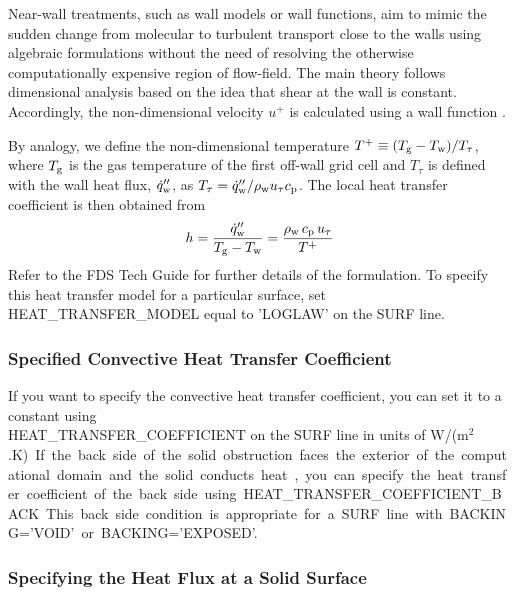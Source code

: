 \documentclass[11pt]{book}
\begin{document}
Near-wall treatments, such as wall models or wall functions, aim to mimic the sudden change from molecular to turbulent transport close to the walls using algebraic formulations without the need of resolving the otherwise computationally expensive region of flow-field. The main theory follows dimensional analysis based on the idea that shear at the wall is constant. Accordingly, the non-dimensional velocity $u^+$ is calculated using a wall function \cite{FDS_Tech_Guide}.

By analogy, we define the non-dimensional temperature $T^+ \equiv (T_{\rm g}-T_{\rm w})/T_\tau$, where $T_{\rm g}$ is the gas temperature of the first off-wall grid cell and $T_\tau$ is defined with the wall heat flux, $\dot{q}''_{\rm w}$, as $T_\tau = \dot{q}''_{\rm w}/\rho_{\rm w} u_\tau c_{\rm p}$. The local heat transfer coefficient is then obtained from
\begin{equation}
h = \frac{\dot{q}''_{\rm w}}{T_{\rm g}-T_{\rm w}} = \frac{\rho_{\rm w} \, c_{\rm p} \, u_\tau}{T^+}
\end{equation}
Refer to the FDS Tech Guide \cite{FDS_Tech_Guide} for further details of the formulation. To specify this heat transfer model for a particular surface, set {\ct HEAT\_TRANSFER\_MODEL} equal to {\ct 'LOGLAW'} on the {\ct SURF} line.

\subsubsection{Specified Convective Heat Transfer Coefficient}

If you want to specify the convective heat transfer coefficient, you can set it to a constant using \\
{\ct HEAT\_TRANSFER\_COEFFICIENT} on the {\ct SURF} line in units of \si{W/(m$^2$.K)}. If the back side of the solid obstruction faces the exterior of the computational domain and the solid conducts heat, you can specify the heat transfer coefficient of the back side using {\ct HEAT\_TRANSFER\_COEFFICIENT\_BACK}. This back side condition is appropriate for a {\ct SURF} line with {\ct BACKING='VOID'} or {\ct BACKING='EXPOSED'}.


\subsubsection{Specifying the Heat Flux at a Solid Surface}
\end{document}
